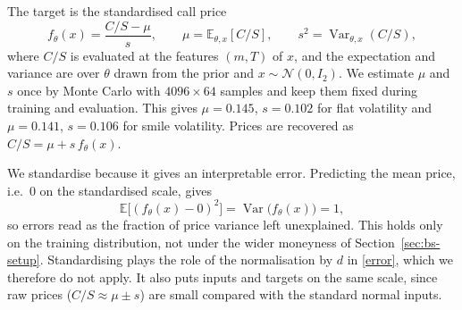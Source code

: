   The target is the standardised call price
  \begin{equation}
    f_\theta(x) = \frac{C/S - \mu}{s}, \qquad
    \mu = \mathbb{E}_{\theta, x}[C/S], \qquad
    s^2 = \operatorname{Var}_{\theta, x}(C/S),
  \end{equation}
  where $C/S$ is evaluated at the features $(m, T)$ of $x$, and the expectation and
  variance are over $\theta$ drawn from the prior and $x \sim \mathcal{N}(0, I_2)$. We
  estimate $\mu$ and $s$ once by Monte Carlo with $4096 \times 64$ samples and keep them
  fixed during training and evaluation. This gives $\mu = 0.145$, $s = 0.102$ for flat
  volatility and $\mu = 0.141$, $s = 0.106$ for smile volatility. Prices are recovered as
  $C/S = \mu + s\, f_\theta(x)$.

  We standardise because it gives an interpretable error. Predicting the mean price,
  i.e.\ $0$ on the standardised scale, gives
  \begin{equation}
    \mathbb{E}\big[(f_\theta(x) - 0)^2\big] = \operatorname{Var}\big(f_\theta(x)\big) = 1,
  \end{equation}
  so errors read as the fraction of price variance left unexplained. This holds only on
  the training distribution, not under the wider moneyness of
  Section~\ref{sec:bs-setup}. Standardising plays the role of the normalisation by $d$ in
  \eqref{error}, which we therefore do not apply. It also puts inputs and targets on the
  same scale, since raw prices ($C/S \approx \mu \pm s$) are small compared with the
  standard normal inputs.
